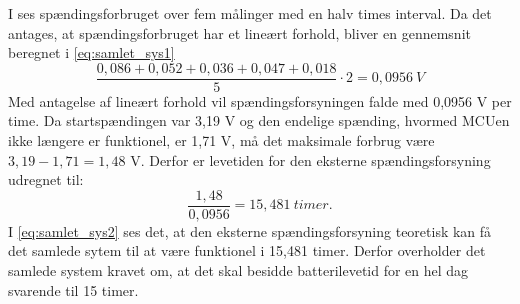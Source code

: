 I  ses spændingsforbruget over fem målinger med en halv times interval. Da det antages, at spændingsforbruget har et lineært forhold, bliver en gennemsnit beregnet i \eqref{eq:samlet_sys1}
\begin{equation}
\frac{0,086 + 0,052 + 0,036 + 0,047 + 0,018}{5} \cdot 2 = 0,0956~V
\label{eq:samlet_sys1}
\end{equation}
Med antagelse af lineært forhold vil spændingsforsyningen falde med 0,0956 V per time. Da startspændingen var 3,19 V og den endelige spænding, hvormed MCUen ikke længere er funktionel, er 1,71 V, må det maksimale forbrug være $3,19 - 1,71 = 1,48$ V. Derfor er levetiden for den eksterne spændingsforsyning udregnet til:
\begin{equation}
\frac{1,48}{0,0956} = 15,481~timer.
\label{eq:samlet_sys2}
\end{equation}
I \eqref{eq:samlet_sys2} ses det, at den eksterne spændingsforsyning teoretisk kan få det samlede sytem til at være funktionel i 15,481 timer. Derfor overholder det samlede system kravet om, at det skal besidde batterilevetid for en hel dag svarende til 15 timer.
%
%
%
